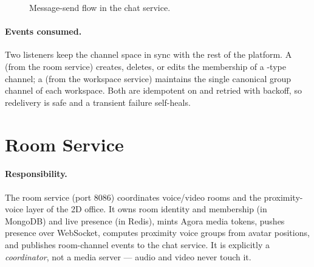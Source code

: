 \begin{figure}[htbp]
\centering
{}
\caption{Message-send flow in the chat service.}
\label{fig:chat-send}
\end{figure}

\paragraph{Events consumed.} Two listeners keep the channel space in sync with
the rest of the platform. A  (from the room service)
creates, deletes, or edits the membership of a -type channel; a
 (from the workspace service) maintains the single
canonical group channel of each workspace. Both are idempotent on 
and retried with backoff, so redelivery is safe and a transient failure
self-heals.

\section{Room Service}
\label{sec:be-room}

\paragraph{Responsibility.} The room service (port 8086) coordinates
voice/video rooms and the proximity-voice layer of the 2D office. It owns room
identity and membership (in MongoDB) and live presence (in Redis), mints Agora
media tokens, pushes presence over WebSocket, computes proximity voice groups
from avatar positions, and publishes room-channel events to the chat service. It
is explicitly a \emph{coordinator}, not a media server --- audio and video never
touch it.

